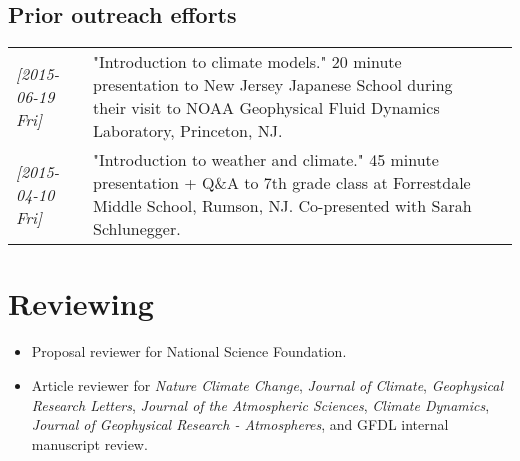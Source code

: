 \documentclass[12pt,letterpaper]{shillcv}
\begin{document}
\subsection*{Prior outreach efforts}
\label{sec:org94c20ee}
\begin{center}
\begin{tabularx}{\textwidth}{lX}
\textit{[2015-06-19 Fri]} & "Introduction to climate models."  20 minute presentation to New Jersey Japanese School during their visit to NOAA Geophysical Fluid Dynamics Laboratory, Princeton, NJ. &  &  & \\
\textit{[2015-04-10 Fri]} & "Introduction to weather and climate."  45 minute presentation + Q\&A to 7th grade class at Forrestdale Middle School, Rumson, NJ.  Co-presented with Sarah Schlunegger. &  &  & \\
\end{tabularx}
\end{center}
\section*{Reviewing}
\label{sec:orgc58e7c0}
\begin{itemize}
\item Proposal reviewer for National Science Foundation.
\item Article reviewer for \emph{Nature Climate Change}, \emph{Journal of Climate},
\emph{Geophysical Research Letters}, \emph{Journal of the Atmospheric Sciences},
\emph{Climate Dynamics}, \emph{Journal of Geophysical Research - Atmospheres}, and GFDL
internal manuscript review.
\end{itemize}
\end{document}
